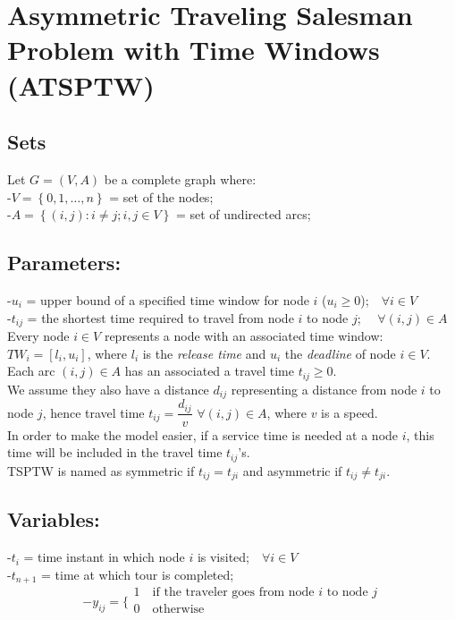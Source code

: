 \documentclass[a4paper,12pt,titlepage]{article}
\begin{document}
\section*{Asymmetric Traveling Salesman Problem with Time Windows (ATSPTW)}
\subsection*{Sets}
Let $G = (V, A)$ be a complete graph where: \\
-$V=\left \lbrace 0,1, …, n\right\rbrace$ = set of the nodes;\\
-$A=\left \lbrace(i, j): i \neq j; i,j\in V\right\rbrace$ = set of undirected arcs;
\subsection*{Parameters:}
-$u_i$ = upper bound of a specified time window for node $i$ ($u_i\geq 0$);\,\,\,\ $\forall i\in V$\\
-$t_{ij}$ = the shortest time required to travel from node $i$ to node $j$;
\,\,\,\ $\forall(i,j)\in A$\\
Every node $i\in V$ represents a node with an associated time window:\\
$TW_i=[l_i, u_i]$, where
$l_i$ is the  \textit{release time} and $u_i$ the \textit{deadline} of node $i\in V$. \\
Each arc $(i, j) \in A$ has
an associated a travel time $t_{ij} \geq 0$.\\
We assume they also have a distance  $d_{ij}$ representing a distance from node $i$ to node $j$, hence travel time $t_{ij} = \dfrac{d_{ij}}{v}$ $\forall (i,j)\in A$, where $v$ is a speed.\\
In order to make the model easier, if a service time is needed at a node $i$, this time will be included in the travel time $t_{ij}$’s.\\
TSPTW is named as symmetric if $t_{ij}= t_{ji}$ and asymmetric if $t_{ij} \neq t_{ji}$.

\subsection*{Variables:}
-$t_i$ = 
time instant in which node $i$ is visited;\,\,\,\ $\forall i\in V$\\
-$t_{n+1}$ =  time at which tour is completed;\\
$$-y_{ij}=
\bigg \{
\begin{array}{ll}
1\quad \text{if the traveler goes from node $i$ to node $j$}\\
0\quad \text{otherwise} \\
\end{array}
$$
\newpage
\end{document}
